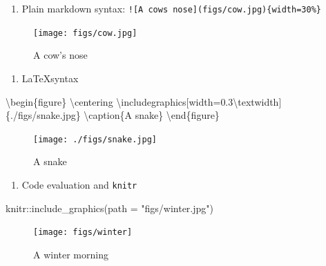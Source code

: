 \documentclass[
  11pt,
]{scrartcl}
\newenvironment{Shaded}{\begin{snugshade}}{\end{snugshade}}
\newcommand{\AttributeTok}[1]{\textcolor[rgb]{0.77,0.63,0.00}{#1}}
\newcommand{\FloatTok}[1]{\textcolor[rgb]{0.00,0.00,0.81}{#1}}
\newcommand{\FunctionTok}[1]{\textcolor[rgb]{0.00,0.00,0.00}{#1}}
\newcommand{\NormalTok}[1]{#1}
\newcommand{\OtherTok}[1]{\textcolor[rgb]{0.56,0.35,0.01}{#1}}
\newcommand{\SpecialCharTok}[1]{\textcolor[rgb]{0.00,0.00,0.00}{#1}}
\newcommand{\StringTok}[1]{\textcolor[rgb]{0.31,0.60,0.02}{#1}}
\providecommand{\tightlist}{%
  \setlength{\itemsep}{0pt}\setlength{\parskip}{0pt}}
\begin{document}
\begin{enumerate}
\def\labelenumi{\arabic{enumi}.}
\tightlist
\item
  Plain markdown syntax: \texttt{!{[}A\ cow\textquotesingle{}s\ nose{]}(figs/cow.jpg)\{width=30\%\}}
\end{enumerate}

\begin{figure}
\centering
\texttt{[image: figs/cow.jpg]}
\caption{A cow's nose}
\end{figure}

\begin{enumerate}
\def\labelenumi{\arabic{enumi}.}
\setcounter{enumi}{1}
\tightlist
\item
  \LaTeX syntax
\end{enumerate}

\begin{Shaded}
\begin{Highlighting}[]
\NormalTok{\textbackslash{}begin\{figure\}}
\NormalTok{\textbackslash{}centering}
\NormalTok{\textbackslash{}includegraphics[width}\OtherTok{=}\FloatTok{0.3}\NormalTok{\textbackslash{}textwidth]\{.}\SpecialCharTok{/}\NormalTok{figs}\SpecialCharTok{/}\NormalTok{snake.jpg\}}
\NormalTok{\textbackslash{}caption\{A snake\}}
\NormalTok{\textbackslash{}end\{figure\}}
\end{Highlighting}
\end{Shaded}

\begin{figure}
\centering
\texttt{[image: ./figs/snake.jpg]}
\caption{A snake}
\end{figure}

\begin{enumerate}
\def\labelenumi{\arabic{enumi}.}
\setcounter{enumi}{2}
\tightlist
\item
  Code evaluation and \texttt{knitr}
\end{enumerate}

\begin{Shaded}
\begin{Highlighting}[]
\NormalTok{knitr}\SpecialCharTok{::}\FunctionTok{include\_graphics}\NormalTok{(}\AttributeTok{path =} \StringTok{"figs/winter.jpg"}\NormalTok{)}
\end{Highlighting}
\end{Shaded}

\begin{figure}

{\centering \texttt{[image: figs/winter]} 

}

\caption{A winter morning}\label{fig:winter}
\end{figure}
\end{document}
